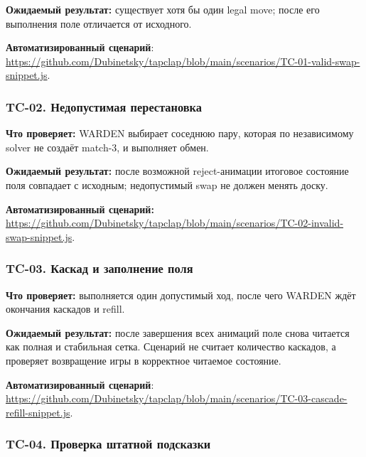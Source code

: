 \documentclass{ZGJournalArticle_2026}
\begin{document}
\textbf{Ожидаемый результат:} существует хотя бы один legal move; после
его выполнения поле отличается от исходного.

\textbf{Автоматизированный сценарий}:
\href{../scenarios/TC-01-valid-swap-snippet.js}{https://github.com/Dubinetsky/tapclap/blob/main/scenarios/TC-01-valid-swap-snippet.js}.

\subsubsection{TC-02. Недопустимая
перестановка}\label{tc-02.-ux43dux435ux434ux43eux43fux443ux441ux442ux438ux43cux430ux44f-ux43fux435ux440ux435ux441ux442ux430ux43dux43eux432ux43aux430}

\textbf{Что проверяет:} WARDEN выбирает соседнюю пару, которая по
независимому solver не создаёт match-3, и выполняет обмен.

\textbf{Ожидаемый результат:} после возможной reject-анимации итоговое
состояние поля совпадает с исходным; недопустимый swap не должен менять
доску.

\textbf{Автоматизированный сценарий:}
\href{../scenarios/TC-02-invalid-swap-snippet.js}{https://github.com/Dubinetsky/tapclap/blob/main/scenarios/TC-02-invalid-swap-snippet.js}.

\subsubsection{TC-03. Каскад и заполнение
поля}\label{tc-03.-ux43aux430ux441ux43aux430ux434-ux438-ux437ux430ux43fux43eux43bux43dux435ux43dux438ux435-ux43fux43eux43bux44f}

\textbf{Что проверяет:} выполняется один допустимый ход, после чего
WARDEN ждёт окончания каскадов и refill.

\textbf{Ожидаемый результат:} после завершения всех анимаций поле снова
читается как полная и стабильная сетка. Сценарий не считает количество
каскадов, а проверяет возвращение игры в корректное читаемое состояние.

\textbf{Автоматизированный сценарий}:
\href{../scenarios/TC-03-cascade-refill-snippet.js}{https://github.com/Dubinetsky/tapclap/blob/main/scenarios/TC-03-cascade-refill-snippet.js}.

\subsubsection{TC-04. Проверка штатной
подсказки}\label{tc-04.-ux43fux440ux43eux432ux435ux440ux43aux430-ux448ux442ux430ux442ux43dux43eux439-ux43fux43eux434ux441ux43aux430ux437ux43aux438}
\end{document}
